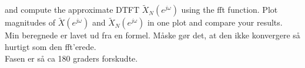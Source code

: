 \begin{Opgaver}
\begin{kapitel}
\begin{Opgave}
            \begin{UnderOpgave}[Choose first N = 20 samples of \text{$x[n]$}]
                and compute the approximate DTFT $\tilde{X}_N(e^{j\omega})$ using the fft function. 
                Plot magnitudes of $\tilde{X}(e^{j\omega})$ and $\tilde{X}_N(e^{j\omega})$ in one plot and
                compare your results.\\
                Min beregnede er lavet ud fra en formel. Måske gør det, at den ikke konvergere så hurtigt som den fft'erede. \\
                Fasen er så ca 180 graders forskudte. 

            \end{UnderOpgave}
            
            \begin{UnderOpgave}[Repeat part (b) using N = 50.]
                \vspace{60pt}
            \end{UnderOpgave}


\end{Opgave}
\end{kapitel}
\end{Opgaver}
